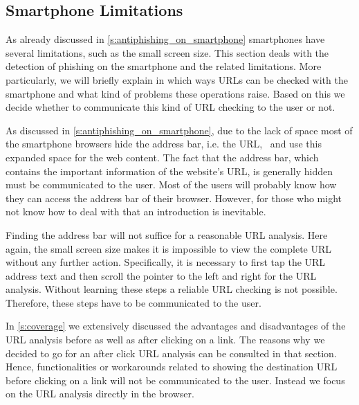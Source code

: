 \subsection{Smartphone Limitations}
As already discussed in \autoref{s:antiphishing_on_smartphone} smartphones have several limitations, such as the small screen size. 
This section deals with the detection of phishing on the smartphone and the related limitations.
More particularly, we will briefly explain in which ways URLs can be checked with the smartphone and what kind of problems these operations raise.
Based on this we decide whether to communicate this kind of URL checking to the user or not.

\begin{description}[leftmargin=0cm]
	\item[Invisible Address Bar] As discussed in \autoref{s:antiphishing_on_smartphone}, due to the lack of space most of the smartphone browsers hide the address bar, i.e. the URL,~\cite{amrutkar2012measuring} and use this expanded space for the web content. 
The fact that the address bar, which contains the important information of the website's URL, is generally hidden must be communicated to the user.
Most of the users will probably know how they can access the address bar of their browser.
However, for those who might not know how to deal with that an introduction is inevitable.

	\item[Analyze Complete URL Via Address Bar] Finding the address bar will not suffice for a reasonable URL analysis. 
Here again, the small screen size makes it is impossible to view the complete URL without any further action.
Specifically, it is necessary to first tap the URL address text and then scroll the pointer to the left and right for the URL analysis.
Without learning these steps a reliable URL checking is not possible. 
Therefore, these steps have to be communicated to the user.

	\item[Show URL Before Click] In \autoref{s:coverage} we extensively discussed the advantages and disadvantages of the URL analysis before as well as after clicking on a link.
The reasons why we decided to go for an after click URL analysis can be consulted in that section.
Hence, functionalities or workarounds related to showing the destination URL before clicking on a link will not be communicated to the user.
Instead we focus on the URL analysis directly in the browser.
\end{description}

